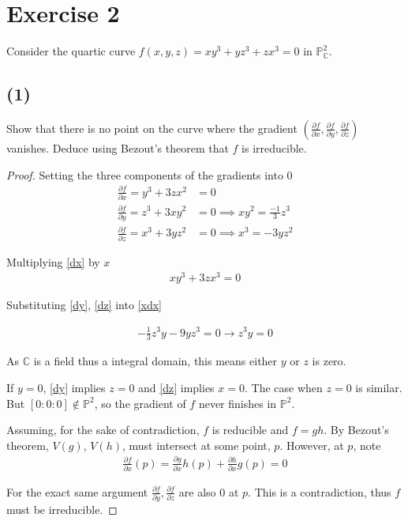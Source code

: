 \documentclass{article}
\theoremstyle{definition}
\theoremstyle{definition}
\theoremstyle{remark}
\newcommand{\bb}[1]{\mathbb{#1}} %
\begin{document}
\section*{Exercise 2}
Consider the quartic curve \(f(x, y, z) = xy^3 + yz^3 + zx^3 = 0\) in \(\mathbb{P}^2_\mathbb{C}\).

\subsection*{(1)}

Show that there is no point on the curve where the gradient \(\left(\frac{\partial f}{\partial x}, \frac{\partial f}{\partial y}, \frac{\partial f}{\partial z}\right)\) vanishes. Deduce using Bezout's theorem that \(f\) is irreducible.

\begin{proof}
	Setting the three components of the gradients into 0
	\begin{align}
		\label{dx}
		\frac{\partial f}{\partial x} = y^3 + 3zx^2	 &= 0\\
		\label{dy}
		\frac{\partial f}{\partial y} = z^3 + 3xy^2	&= 0 \implies xy^2 = \frac{-1}{3}z^3\\
		\label{dz}
		\frac{\partial f}{\partial z} = x^3 + 3yz^2	 &= 0 \implies x^3 = -3yz^2
	\end{align}

Multiplying \ref{dx} by $x$
\begin{align}\label{xdx}
	xy^3 + 3zx^3 = 0	
\end{align}

Substituting \ref{dy}, \ref{dz} into \ref{xdx}

\begin{align}
	-\frac{1}{3}z^3 y - 9 yz^3 = 0 \rightarrow z^3y = 0	
\end{align}

As $\bb{C}$ is a field thus a integral domain, this means either $y$ or $z$ is zero. 

If $y = 0$, \ref{dy} implies $z = 0$ and \ref{dz} implies $x = 0$. 
The case when $z = 0$ is similar. 
But $[0:0:0] \notin \bb{P}^2$, so the gradient of $f$ never finishes in $\bb{P}^2$.

Assuming, for the sake of contradiction, $f$ is reducible and $f = gh$.
By Bezout's theorem, $V(g)$, $V(h)$, must intersect at some point, $p$. 
However, at $p$, note 
\begin{align}
	\frac{\partial f}{\partial x} (p) = \frac{\partial g}{\partial x}h(p) +  \frac{\partial h}{\partial x}g(p) = 0
\end{align}

For the exact same argument $\frac{\partial f}{\partial y}, \frac{\partial f}{\partial z}$ are also $0$ at $p$. 
This is a contradiction, thus $f$ must be irreducible.

\end{proof}
\end{document}
